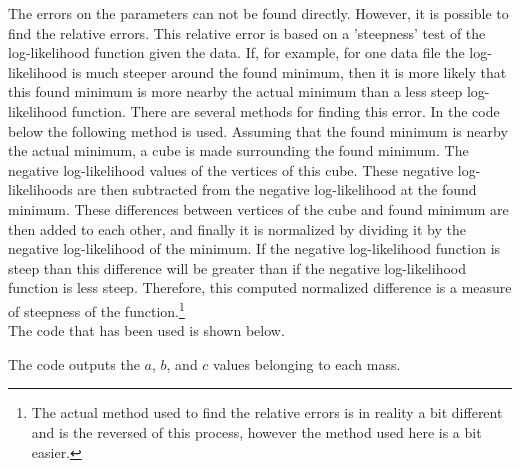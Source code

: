 The errors on the parameters can not be found directly. However, it is possible to find the relative errors. This relative error is based on a 'steepness' test of the log-likelihood function given the data. If, for example, for one data file the log-likelihood is much steeper around the found minimum, then it is more likely that this found minimum is more nearby the actual minimum than a less steep log-likelihood function. There are several methods for finding this error. In the code below the following method is used. Assuming that the found minimum is nearby the actual minimum, a cube is made surrounding the found minimum. The negative log-likelihood values of the vertices of this cube. These negative log-likelihoods are then subtracted from the negative log-likelihood at the found minimum. These differences between vertices of the cube and found minimum are then added to each other, and finally it is normalized by dividing it by the negative log-likelihood of the minimum. If the negative log-likelihood function is steep than this difference will be greater than if the negative log-likelihood function is less steep. Therefore, this computed normalized difference is a measure of steepness of the function.\footnote{The actual method used to find the relative errors is in reality a bit different and is the reversed of this process, however the method used here is a bit easier.}\\
The code that has been used is shown below.


The code outputs the $a$, $b$, and $c$ values belonging to each mass.

